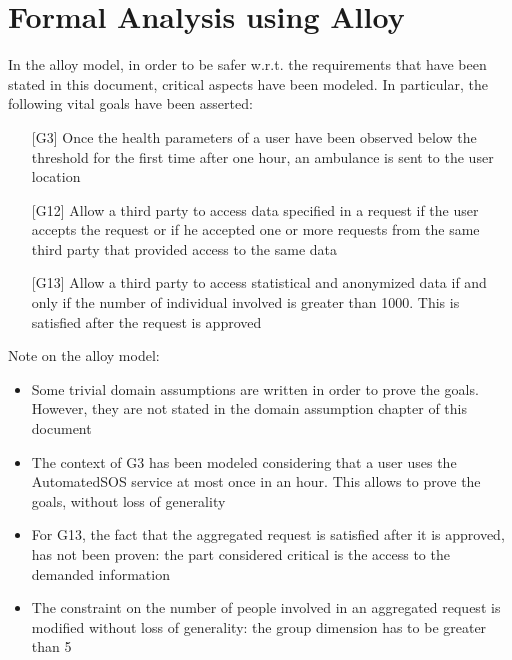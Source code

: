 \section{Formal Analysis using Alloy}
In the alloy model, in order to be safer w.r.t. the requirements that have been stated in this document, critical aspects have been modeled. 
In particular, the following vital goals have been asserted:
\begin{enumerate}
\item[{[G3]}] Once the health parameters of a user have been observed below the threshold for the first time after one hour, an ambulance is sent to the user location
\item[{[G12]}]  Allow a third party to access data specified in a request if the user accepts the request or if he accepted one or more requests from the same third party that provided access to the same data 
\item[{[G13]}] Allow a third party to access statistical and anonymized data if and only if the number of individual involved is greater than 1000. This is satisfied after the request is approved  
\end{enumerate}

Note on the alloy model: 
\begin{itemize}
\item Some trivial domain assumptions are written in order to prove the goals. 
However, they are not stated in the domain assumption chapter of this document 
\item The context of G3 has been modeled considering that a user uses the AutomatedSOS service at most once in an hour. 
This allows to prove the goals, without loss of generality 
\item For G13, the fact that the aggregated request is satisfied after it is approved, has not been proven: the part considered critical is the access to the demanded information 
\item The constraint on the number of people involved in an aggregated request is modified without loss of generality: the group dimension has to be greater than 5 
\end{itemize}



